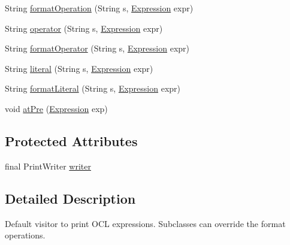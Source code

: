 \begin{DoxyCompactItemize}
\item 
String \hyperlink{classorg_1_1tzi_1_1use_1_1uml_1_1ocl_1_1expr_1_1_expression_print_visitor_a19b9f51fd68be6f69998b65731f73ad0}{format\-Operation} (String s, \hyperlink{classorg_1_1tzi_1_1use_1_1uml_1_1ocl_1_1expr_1_1_expression}{Expression} expr)
\item 
String \hyperlink{classorg_1_1tzi_1_1use_1_1uml_1_1ocl_1_1expr_1_1_expression_print_visitor_af08ace75b6971ca22d386543d5125be6}{operator} (String s, \hyperlink{classorg_1_1tzi_1_1use_1_1uml_1_1ocl_1_1expr_1_1_expression}{Expression} expr)
\item 
String \hyperlink{classorg_1_1tzi_1_1use_1_1uml_1_1ocl_1_1expr_1_1_expression_print_visitor_a2ff9234295ab7e1b4bf5fc67376b084e}{format\-Operator} (String s, \hyperlink{classorg_1_1tzi_1_1use_1_1uml_1_1ocl_1_1expr_1_1_expression}{Expression} expr)
\item 
String \hyperlink{classorg_1_1tzi_1_1use_1_1uml_1_1ocl_1_1expr_1_1_expression_print_visitor_aa29b90c7ba1d21c8c3430fa8c279aaa5}{literal} (String s, \hyperlink{classorg_1_1tzi_1_1use_1_1uml_1_1ocl_1_1expr_1_1_expression}{Expression} expr)
\item 
String \hyperlink{classorg_1_1tzi_1_1use_1_1uml_1_1ocl_1_1expr_1_1_expression_print_visitor_a6b6c2a2344c6062f0e5b6ae37fa3a97d}{format\-Literal} (String s, \hyperlink{classorg_1_1tzi_1_1use_1_1uml_1_1ocl_1_1expr_1_1_expression}{Expression} expr)
\item 
void \hyperlink{classorg_1_1tzi_1_1use_1_1uml_1_1ocl_1_1expr_1_1_expression_print_visitor_a2068ca9dfd5f4e2891c0a0c91feba3dd}{at\-Pre} (\hyperlink{classorg_1_1tzi_1_1use_1_1uml_1_1ocl_1_1expr_1_1_expression}{Expression} exp)
\end{DoxyCompactItemize}
\subsection*{Protected Attributes}
\begin{DoxyCompactItemize}
\item 
final Print\-Writer \hyperlink{classorg_1_1tzi_1_1use_1_1uml_1_1ocl_1_1expr_1_1_expression_print_visitor_a1a56f96b52f112ace288e8fcf3e62a34}{writer}
\end{DoxyCompactItemize}


\subsection{Detailed Description}
Default visitor to print O\-C\-L expressions. Subclasses can override the format operations.

